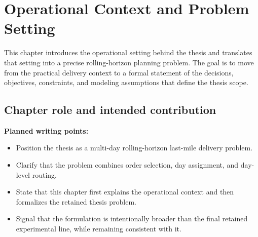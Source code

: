 \chapter{Operational Context and Problem Setting}
\label{ch:operational_context_problem_setting}

%
%

This chapter introduces the operational setting behind the thesis and translates that setting into a precise rolling-horizon planning problem. The goal is to move from the practical delivery context to a formal statement of the decisions, objectives, constraints, and modeling assumptions that define the thesis scope.

\section{Chapter role and intended contribution}
\label{sec:chapter03_role}

%
%

\noindent\textbf{Planned writing points:}
\begin{itemize}
    \item Position the thesis as a multi-day rolling-horizon last-mile delivery problem.
    \item Clarify that the problem combines order selection, day assignment, and day-level routing.
    \item State that this chapter first explains the operational context and then formalizes the retained thesis problem.
    \item Signal that the formulation is intentionally broader than the final retained experimental line, while remaining consistent with it.
\end{itemize}

